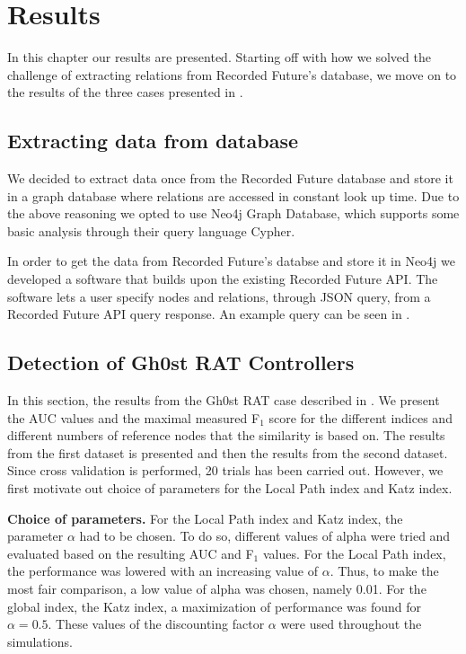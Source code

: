 \chapter{Results}
In this chapter our results are presented. Starting off with how we solved the challenge of extracting relations from Recorded Future's database, we move on to the results of the three cases presented in . 

\section{Extracting data from database}
We decided to extract data once from the Recorded Future database and store it in a graph database where relations are accessed in constant look up time. Due to the above reasoning we opted to use Neo4j Graph Database, which supports some basic analysis through their query language Cypher.

In order to get the data from Recorded Future's databse and store it in Neo4j we developed a software that builds upon the existing Recorded Future API. The software lets a user specify nodes and relations, through JSON query, from a Recorded Future API query response. An example query can be seen in .

\section{Detection of Gh0st RAT Controllers}
In this section, the results from the Gh0st RAT case described in . We present the AUC values and the maximal measured F$_1$ score for the different indices and different numbers of reference nodes that the similarity is based on. The results from the first dataset is presented and then the results from the second dataset. Since cross validation is performed, 20 trials has been carried out. However, we first motivate out choice of parameters for the Local Path index and Katz index.

\textbf{Choice of parameters.} For the Local Path index and Katz index,  the parameter $\alpha$ had to be chosen. To do so, different values of alpha were tried and evaluated based on the resulting AUC and F$_1$ values. For the Local Path index, the performance was lowered with an increasing value of $\alpha$. Thus, to make the most fair comparison, a low value of alpha was chosen, namely 0.01. For the global index, the Katz index, a maximization of performance was found for $\alpha=0.5$. These values of the discounting factor $\alpha$ were used throughout the simulations. 

